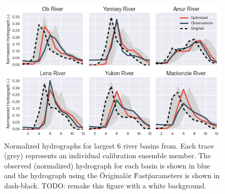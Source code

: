 \documentclass[jgrga, draft]{agutex}
\begin{document}
\clearpage
\begin{figure}
\noindent\includegraphics[width=40pc,natwidth=1]{calibration_hydrographs}
\caption{Normalized hydrographs for largest 6 river basins from.  Each trace (grey) represents an individual calibration ensemble member. The observed (normalized) hydrograph for each basin is shown in blue and the hydrograph using the \"Original\" or \"Fast\" parameters is shown in dash-black. TODO: remake this figure with a white background.}
\label{fig:calibration_hydrographs}
\end{figure}
\end{document}
